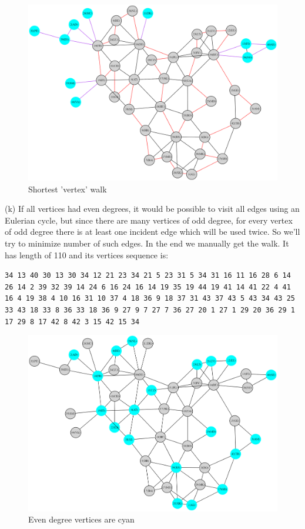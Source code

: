 \documentclass{article}
\begin{document}
	\begin{figure}[h]
		\centering
		\includegraphics[width=1\textwidth]{v_walk.png}
		\caption{Shortest 'vertex' walk}
	\end{figure}\newpage
	(k)  If all vertices had even degrees, it would be possible to visit all edges using an Eulerian cycle, but since there are many vertices of odd degree, for every vertex of odd degree there is at least one incident edge which will be used twice. So we'll try to minimize number of such edges. In the end we manually get the walk. It has length of 110 and its vertices sequence is:\par
	\texttt{34 13 40 30 13 30 34 12 21 23 34 21 5 23 31 5 34 31 16 11 16 28 6 14 26 14 2 39 32 39
	14 24 6 16 24 16 14 19 35 19 44 19 41 14 41 22 4 41 16 4 19 38 4 10 16 31 10 37 4 18 36 9 18 37 31 43 37 43 5 43 34 43 25 33 43 18 33 8 36 33 18 36 9 27 9 7 27 7 36 27 20 1 27 1 29 20 36 29 1 17 29 8 17 42 8 42 3 15 42 15 34}
	\begin{figure}[h]
		\centering
		\includegraphics[width=1\textwidth]{even.png}
		\caption{Even degree vertices are cyan}
	\end{figure}\newpage
\end{document}
